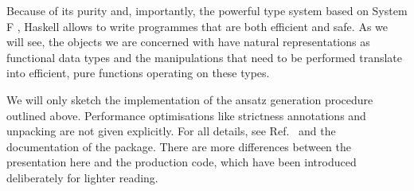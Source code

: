 Because of its purity and, importantly, the powerful type system based on System F \cite{Girard_1972}, Haskell allows to write programmes that are both efficient and safe. As we will see, the objects we are concerned with have natural representations as functional data types and the manipulations that need to be performed translate into efficient, pure functions operating on these types.

We will only sketch the implementation of the ansatz generation procedure outlined above. Performance optimisations like strictness annotations and unpacking are not given explicitly. For all details, see Ref.\ \cite{Reinhart_2019} and the documentation \cite{Reinhart_2019_sparse-tensor} of the package. There are more differences between the presentation here and the production code, which have been introduced deliberately for lighter reading.

